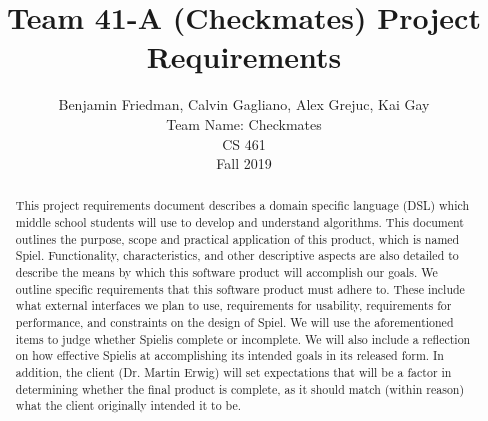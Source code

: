 \documentclass[10pt,letter,draftclsnofoot,onecolumn]{IEEEtran}
\begin{document}
\newcommand\name{Spiel}

%
%
\title{Team 41-A (Checkmates) Project Requirements}
\author{Benjamin Friedman, Calvin Gagliano, Alex Grejuc, Kai Gay\\
Team Name: Checkmates \\
CS 461\\
Fall 2019\\
}


\begin{titlepage}
        \maketitle
        

        \begin{singlespace}
        \begin{abstract}
            This project requirements document describes a domain specific language (DSL) which middle school students will use to develop and understand algorithms. This document outlines the purpose, scope and practical application of this product, which is named \name. Functionality, characteristics, and other descriptive aspects are also detailed to describe the means by which this software product will accomplish our goals. We outline specific requirements that this software product must adhere to. These include what external interfaces we plan to use, requirements for usability, requirements for performance, and constraints on the design of \name. We will use the aforementioned items to judge whether \name is complete or incomplete. We will also include a reflection on how effective \name is at accomplishing its intended goals in its released form. In addition, the client (Dr. Martin Erwig) will set expectations that will be a factor in determining whether the final product is complete, as it should match (within reason) what the client originally intended it to be.
        \end{abstract}
        \end{singlespace}
\end{titlepage}
 
\end{document}

